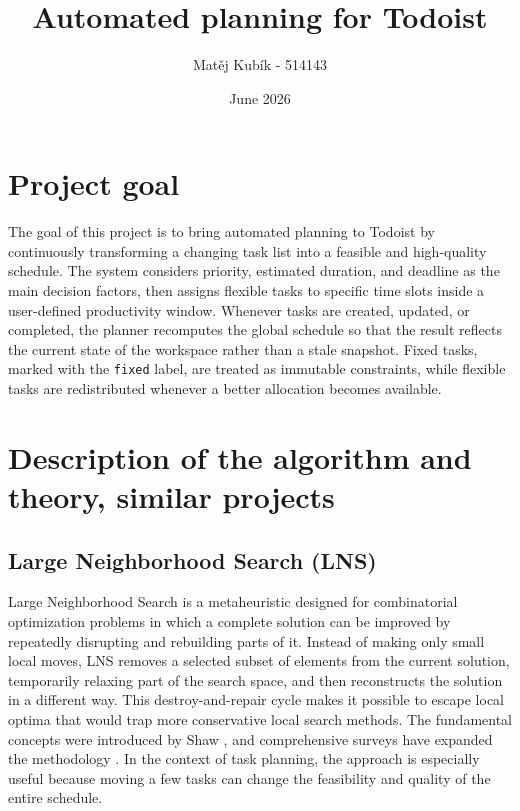\documentclass{article}
\title{Automated planning for Todoist}
\author{Matěj Kubík - 514143}
\date{June 2026}
\begin{document}
\maketitle

\section{Project goal}
The goal of this project is to bring automated planning to Todoist by continuously transforming a changing task list into a feasible and high-quality schedule. The system considers priority, estimated duration, and deadline as the main decision factors, then assigns flexible tasks to specific time slots inside a user-defined productivity window. Whenever tasks are created, updated, or completed, the planner recomputes the global schedule so that the result reflects the current state of the workspace rather than a stale snapshot. Fixed tasks, marked with the \texttt{fixed} label, are treated as immutable constraints, while flexible tasks are redistributed whenever a better allocation becomes available.

\section{Description of the algorithm and theory, similar projects}

\subsection{Large Neighborhood Search (LNS)}
Large Neighborhood Search is a metaheuristic designed for combinatorial optimization problems in which a complete solution can be improved by repeatedly disrupting and rebuilding parts of it. Instead of making only small local moves, LNS removes a selected subset of elements from the current solution, temporarily relaxing part of the search space, and then reconstructs the solution in a different way. This destroy-and-repair cycle makes it possible to escape local optima that would trap more conservative local search methods. The fundamental concepts were introduced by Shaw \cite{shaw1998}, and comprehensive surveys have expanded the methodology \cite{pisinger2010}. In the context of task planning, the approach is especially useful because moving a few tasks can change the feasibility and quality of the entire schedule.
\end{document}
